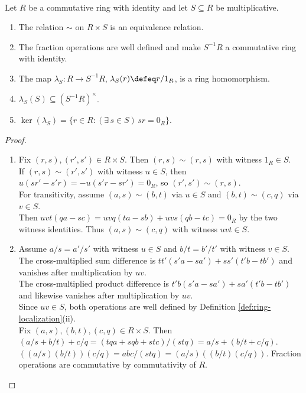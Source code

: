 \begin{proposition} \label{prop:ring-localization-construction}
\\
Let $R$ be a commutative ring with identity and let $S\subseteq R$ be multiplicative.
\begin{enumerate}[label=(\roman*)]
\setlength{\itemsep}{0pt}
\item The relation $\sim$ on $R\times S$ is an equivalence relation.
\item The fraction operations are well defined and make $S^{-1}R$ a commutative ring with identity.
\item The map $\lambda_S:R\to S^{-1}R$, $\lambda_S(r)\defeq r/1_R$, is a ring homomorphism.
\item $\lambda_S(S)\subseteq(S^{-1}R)^\times$.
\item $\ker(\lambda_S)=\{r\in R:(\exists\,s\in S)\,sr=0_R\}$.
\end{enumerate}
\begin{proof}
\begin{enumerate}[label=(\roman*)]
\setlength{\itemsep}{0pt}
\item Fix $(r,s),(r',s')\in R\times S$. Then $(r,s)\sim(r,s)$ with witness $1_R\in S$.\\
If $(r,s)\sim(r',s')$ with witness $u\in S$, then $u(sr'-s'r)=-u(s'r-sr')=0_R$, so $(r',s')\sim(r,s)$.\\
For transitivity, assume $(a,s)\sim(b,t)$ via $u\in S$ and $(b,t)\sim(c,q)$ via $v\in S$.\\
Then $uvt(qa-sc)=uvq(ta-sb)+uvs(qb-tc)=0_R$ by the two witness identities. Thus $(a,s)\sim(c,q)$ with witness $uvt\in S$.
\item Assume $a/s=a'/s'$ with witness $u\in S$ and $b/t=b'/t'$ with witness $v\in S$.\\
The cross-multiplied sum difference is $tt'(s'a-sa')+ss'(t'b-tb')$ and vanishes after multiplication by $uv$.\\
The cross-multiplied product difference is $t'b(s'a-sa')+sa'(t'b-tb')$ and likewise vanishes after multiplication by $uv$.\\
Since $uv\in S$, both operations are well defined by Definition \ref{def:ring-localization}(ii).\\
Fix $(a,s),(b,t),(c,q)\in R\times S$. Then $(a/s+b/t)+c/q=(tqa+sqb+stc)/(stq)=a/s+(b/t+c/q)$.\\
$((a/s)(b/t))(c/q)=abc/(stq)=(a/s)((b/t)(c/q))$. Fraction operations are commutative by commutativity of $R$.\\

\end{enumerate}
\end{proof}
\end{proposition}
